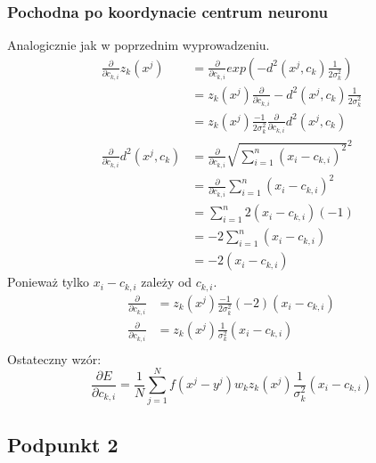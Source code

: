 \documentclass[a4paper, portrait,11pt]{article}
\begin{document}
\subsubsection{Pochodna po koordynacie centrum neuronu}
Analogicznie jak w poprzednim wyprowadzeniu.
\begin{align*}
  \frac{\partial}{\partial{c_{k,i}}}z_k(x^j) &= \frac{\partial}{\partial{c_{k,i}}} exp(-d^2(x^j, c_k) \frac{1}{2\sigma_k^2})\\
    &= z_k(x^j) \frac{\partial}{\partial{c_{k,i}}} -d^2(x^j, c_k) \frac{1}{2\sigma_k^2}\\
    &= z_k(x^j) \frac{-1}{2\sigma_k^2} \frac{\partial}{\partial{c_{k,i}}} d^2(x^j, c_k) \\
  \frac{\partial}{\partial{c_{k,i}}} d^2(x^j, c_k) &= \frac{\partial}{\partial{c_{k,i}}} \sqrt{\sum_{i = 1}^{n} (x_i - c_{k,i})^2}^2\\
  &= \frac{\partial}{\partial{c_{k,i}}} \sum_{i = 1}^{n} (x_i - c_{k,i})^2\\
  &= \sum_{i = 1}^{n} 2 (x_i - c_{k,i}) (-1)\\
  &= -2 \sum_{i = 1}^{n} (x_i - c_{k,i})\\
  &= -2 (x_i - c_{k,i})
\end{align*}
Ponieważ tylko $x_i - c_{k,i}$ zależy od $c_{k,i}$.
\begin{align*}
  \frac{\partial}{\partial{c_{k,i}}} &= z_k(x^j) \frac{-1}{2\sigma_k^2} (-2) (x_i - c_{k,i})\\
  \frac{\partial}{\partial{c_{k,i}}} &= z_k(x^j) \frac{1}{\sigma_k^2} (x_i - c_{k,i})\\
\end{align*}
Ostateczny wzór:
\begin{equation}
\frac{\partial E}{\partial{c_{k,i}}} = \frac{1}{N} \sum_{j=1}^{N} f(x^j - y^j) w_k z_k(x^j) \frac{1}{\sigma_k^2} (x_i - c_{k,i})
\end{equation}
\subsection{Podpunkt 2}
\end{document}
